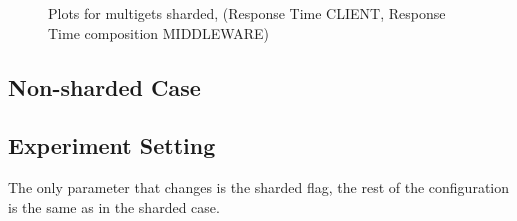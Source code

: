 \documentclass[11pt,a4paper]{article}
\begin{document}
\begin{figure}[!h]
  \centering
    \caption{Plots for multigets sharded, (Response Time CLIENT, Response Time composition MIDDLEWARE)}
  \label{fig:multigets_sharded_mt_rt}
\end{figure}

\subsection{Non-sharded Case}

\subsection{Experiment Setting}

The only parameter that changes is the sharded flag, the rest of the configuration is the same as in the sharded case.
\end{document}
